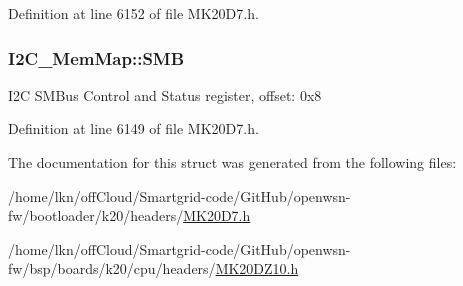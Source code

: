 Definition at line 6152 of file M\+K20\+D7.\+h.

\subsubsection[{\texorpdfstring{S\+MB}{SMB}}]{ I2\+C\+\_\+\+Mem\+Map\+::\+S\+MB}\hypertarget{struct_i2_c___mem_map_a14ca29af4960a6588080acb71f62d5fa}{}\label{struct_i2_c___mem_map_a14ca29af4960a6588080acb71f62d5fa}
I2C S\+M\+Bus Control and Status register, offset\+: 0x8 

Definition at line 6149 of file M\+K20\+D7.\+h.



The documentation for this struct was generated from the following files\+:\begin{DoxyCompactItemize}
\item 
/home/lkn/off\+Cloud/\+Smartgrid-\/code/\+Git\+Hub/openwsn-\/fw/bootloader/k20/headers/\hyperlink{bootloader_2k20_2headers_2_m_k20_d7_8h}{M\+K20\+D7.\+h}\item 
/home/lkn/off\+Cloud/\+Smartgrid-\/code/\+Git\+Hub/openwsn-\/fw/bsp/boards/k20/cpu/headers/\hyperlink{_m_k20_d_z10_8h}{M\+K20\+D\+Z10.\+h}\end{DoxyCompactItemize}

